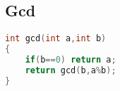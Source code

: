 \subsection{Gcd}
		\begin{lstlisting}[language=c++]
int gcd(int a,int b)
{
	if(b==0) return a;
	return gcd(b,a%b);
}
	\end{lstlisting}